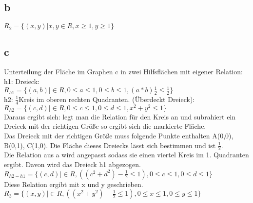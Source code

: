\documentclass{article}
\begin{document}
	\subsection*{b}
	$R_2 = \{(x,y) | x,y \in R, x \geq 1, y \geq 1\}$
	\subsection*{c}
	Unterteilung der Fläche im Graphen c in zwei Hilfsflächen mit eigener Relation: \\
	h1: Dreieck: \\
	$R_{h1} = \{(a,b) | \in R, 0 \leq a \leq 1, 0 \leq b \leq 1, (a * b)\frac{1}{2} \leq \frac{1}{2} \}$ \\
	h2: $\frac{1}{4}$Kreis im oberen rechten Quadranten.	(Überdeckt Dreieck): \\
	$R_{h2} = \{(c,d) | \in R, 0 \leq c \leq 1, 0 \leq d \leq 1, x^2 + y^2 \leq 1 \}$ \\
	Daraus ergibt sich: legt man die Relation für den Kreis an und subrahiert ein Dreieck mit der richtigen Größe so ergibt sich die markierte Fläche. \\
	Das Dreieck mit der richtigen Größe muss folgende Punkte enthalten A(0,0), B(0,1), C(1,0). Die Fläche dieses Dreiecks lässt sich bestimmen und ist $\frac{1}{2}$. \\
	Die Relation aus a wird angepasst sodass sie einen viertel Kreis im 1. Quadranten ergibt. Davon wird das Dreieck h1 abgezogen. \\	
	$R_{h2 - h1} = \{(c,d) | \in R, ((c^2 + d^2) - \frac{1}{2} \leq 1), 0 \leq c \leq 1, 0 \leq d \leq 1\}$ \\
	Diese Relation ergibt mit x und y geschrieben. \\
	$R_3 = \{(x,y) | \in R, ((x^2 + y^2) - \frac{1}{2} \leq 1), 0 \leq x \leq 1, 0 \leq y \leq 1\}$ \\
\end{document}
